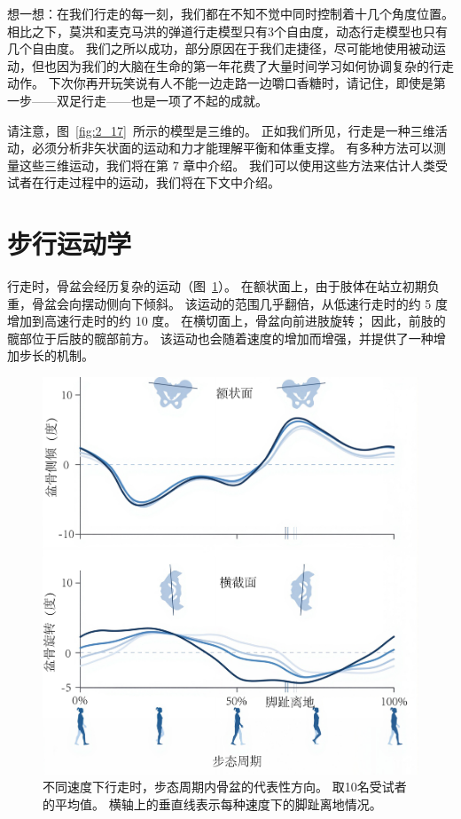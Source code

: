 想一想：在我们行走的每一刻，我们都在不知不觉中同时控制着十几个角度位置。
相比之下，莫洪和麦克马洪的弹道行走模型只有3个自由度，动态行走模型也只有几个自由度。
我们之所以成功，部分原因在于我们走捷径，尽可能地使用被动运动，但也因为我们的大脑在生命的第一年花费了大量时间学习如何协调复杂的行走动作。
下次你再开玩笑说有人不能一边走路一边嚼口香糖时，请记住，即使是第一步——双足行走——也是一项了不起的成就。


请注意，图~\ref{fig:2_17}~所示的模型是三维的。
正如我们所见，行走是一种三维活动，必须分析非矢状面的运动和力才能理解平衡和体重支撑。
有多种方法可以测量这些三维运动，我们将在第 7 章中介绍。
我们可以使用这些方法来估计人类受试者在行走过程中的运动，我们将在下文中介绍。


\section{步行运动学}

行走时，骨盆会经历复杂的运动（图~\ref{fig:2_18}）。
在额状面上，由于肢体在站立初期负重，骨盆会向摆动侧向下倾斜。
该运动的范围几乎翻倍，从低速行走时的约 5 度增加到高速行走时的约 10 度。
在横切面上，骨盆向前进肢旋转；
因此，前肢的髋部位于后肢的髋部前方。
该运动也会随着速度的增加而增强，并提供了一种增加步长的机制。


\begin{figure}[!htb]
	\centering
	\includegraphics[width=0.8\linewidth]{chap2/2_18}
	\caption{不同速度下行走时，步态周期内骨盆的代表性方向。
		取10名受试者的平均值。
		横轴上的垂直线表示每种速度下的脚趾离地情况\cite{arnold2013muscle}。 \label{fig:2_18}}
\end{figure}


